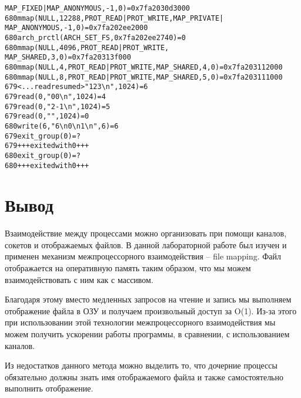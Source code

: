 \documentclass[pdf, unicode, 12pt, a4paper,oneside,fleqn]{article}
\begin{document}
\begin{alltt}
MAP_FIXED|MAP_ANONYMOUS, -1, 0) = 0x7fa2030d3000
680   mmap(NULL, 12288, PROT_READ|PROT_WRITE, MAP_PRIVATE|
MAP_ANONYMOUS, -1, 0) = 0x7fa202ee2000
680   arch_prctl(ARCH_SET_FS, 0x7fa202ee2740) = 0
680   mmap(NULL, 4096, PROT_READ|PROT_WRITE, 
MAP_SHARED, 3, 0) = 0x7fa20313f000
680   mmap(NULL, 4, PROT_READ|PROT_WRITE, MAP_SHARED, 4, 0) = 0x7fa203112000
680   mmap(NULL, 8, PROT_READ|PROT_WRITE, MAP_SHARED, 5, 0) = 0x7fa203111000
679   <... read resumed>"1 2 3\textbackslash{n}", 1024) = 6
679   read(0, "0 0\textbackslash{n}", 1024)            = 4
679   read(0, "2 -1\textbackslash{n}", 1024)           = 5
679   read(0, "", 1024)                 = 0
680   write(6, "6\textbackslash{n}0\textbackslash{n}1\textbackslash{n}", 6)          = 6
679   exit_group(0)                     = ?
679   +++ exited with 0 +++
680   exit_group(0)                     = ?
680   +++ exited with 0 +++
\end{alltt}

\pagebreak

\section{Вывод}

Взаимодействие между процессами можно организовать при помощи каналов, сокетов и отображаемых
файлов. В данной лабораторной работе был изучен и применен механизм межпроцессорного взаимодействия 
\--- file mapping. Файл отображается на оперативную память таким образом, что мы можем взаимодействовать
с ним как с массивом.

Благодаря этому вместо медленных запросов на чтение и запись мы выполняем отображение файла в
ОЗУ и получаем произвольный доступ за O(1). Из-за этого при использовании этой технологии межпроцессорного
взаимодействия мы можем получить ускорении работы программы, в сравнении, с использованием каналов.

Из недостатков данного метода можно выделить то, что дочерние процессы обязательно должны знать
имя отображаемого файла и также самостоятельно выполнить отображение.
\end{document}
